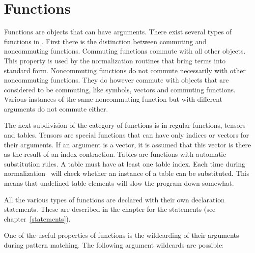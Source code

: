 
\chapter{Functions}
\label{functions}


\noindent Functions are objects that can have arguments. 
There exist several types of functions in \FORM\@. First there is the 
distinction between commuting and 
noncommuting functions. Commuting functions commute 
with all other objects. This property is used by the normalization routines 
that bring terms into standard form. Noncommuting functions do not commute 
necessarily with other noncommuting functions. They do however commute with 
objects that are considered to be commuting, like symbols, vectors and 
commuting functions. Various instances of the same noncommuting function 
but with different arguments do not commute either.

\noindent The next subdivision of the category of functions is in regular 
functions, tensors and 
tables. Tensors are special functions that can have only 
indices or vectors for their arguments. If an argument is a vector, it is 
assumed that this vector is there as the result of an index contraction. 
Tables are functions with automatic substitution rules. A table must have 
at least one table index. Each time 
during normalization \FORM\ will check whether an instance of a table can be 
substituted. This means that undefined table elements will slow the program 
down somewhat.

\noindent All the various types of functions are declared with their own 
declaration statements. These are described in the chapter for the 
statements (see chapter~\ref{statements}).


One of the useful properties of functions is the 
wildcarding of their arguments during pattern matching. The 
following argument wildcards are possible:



